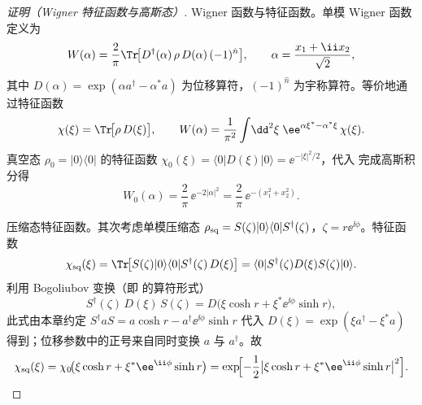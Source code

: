 \begin{proof}[证明（Wigner 特征函数与高斯态）]

Wigner 函数与特征函数。单模 Wigner 函数定义为
\begin{equation}
W(\alpha)=\frac{2}{\pi}\Tr\!\bigl[D^\dagger(\alpha)\,\rho\,D(\alpha)\,(-1)^{\hat n}\bigr],
\qquad
\alpha=\frac{x_1+\ii x_2}{\sqrt2},
\label{eq:wigner-definition}
\end{equation}
其中 \(D(\alpha)=\exp(\alpha a^\dagger-\alpha^*a)\) 为位移算符，\((-1)^{\hat n}\) 为宇称算符。等价地通过特征函数
\begin{equation}
\chi(\xi)=\Tr\!\bigl[\rho\,D(\xi)\bigr],
\qquad
W(\alpha)=\frac{1}{\pi^2}\int\!\dd^2\xi\;\ee^{\alpha\xi^*-\alpha^*\xi}\,\chi(\xi).
\label{eq:wigner-characteristic}
\end{equation}
真空态 \(\rho_0=|0\rangle\langle0|\) 的特征函数 \(\chi_0(\xi)=\langle0|D(\xi)|0\rangle=\ee^{-|\xi|^2/2}\)，代入 完成高斯积分得
\begin{equation}
W_0(\alpha)=\frac{2}{\pi}\,\ee^{-2|\alpha|^2}
=\frac{2}{\pi}\,\ee^{-(x_1^2+x_2^2)}.
\label{eq:vacuum-wigner}
\end{equation}

压缩态特征函数。其次考虑单模压缩态 \(\rho_{\rm sq}=S(\zeta)|0\rangle\langle0|S^\dagger(\zeta)\)，\(\zeta=r\ee^{\ii\phi}\)。特征函数
\begin{equation*}
\chi_{\rm sq}(\xi)=\Tr\!\bigl[S(\zeta)|0\rangle\langle0|S^\dagger(\zeta)\,D(\xi)\bigr]
=\langle0|S^\dagger(\zeta)D(\xi)S(\zeta)|0\rangle.
\end{equation*}
利用 Bogoliubov 变换（即 的算符形式）
\begin{equation}
S^\dagger(\zeta)\,D(\xi)\,S(\zeta)
=D\!\bigl(\xi\cosh r+\xi^*\ee^{\ii\phi}\sinh r\bigr),
\label{eq:displacement-bogoliubov}
\end{equation}
此式由本章约定 \(S^\dagger a S=a\cosh r-a^\dagger\ee^{\ii\phi}\sinh r\) 代入 \(D(\xi)=\exp(\xi a^\dagger-\xi^*a)\) 得到；位移参数中的正号来自同时变换 \(a\) 与 \(a^\dagger\)。故
\begin{equation*}
\chi_{\rm sq}(\xi)=\chi_0\!\bigl(\xi\cosh r+\xi^*\ee^{\ii\phi}\sinh r\bigr)
=\exp\!\Bigl[-\frac12\bigl|\xi\cosh r+\xi^*\ee^{\ii\phi}\sinh r\bigr|^2\Bigr].
\end{equation*}

\end{proof}

